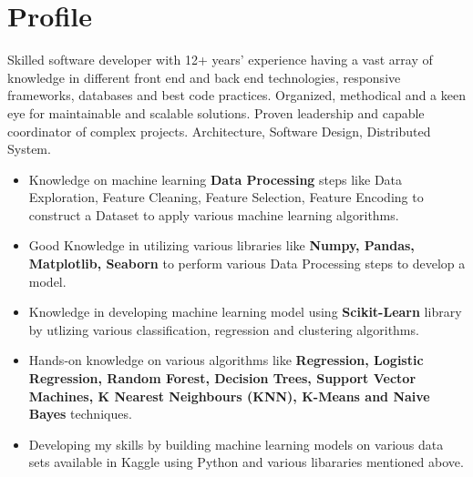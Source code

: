 \documentclass[letterpaper]{sidebarcv} %
\begin{document}
\makeprofile %


\section{Profile}

Skilled software developer with 12+ years’ experience having a vast array of knowledge in different front end and back end technologies, responsive frameworks, databases and best code practices. Organized, methodical and a keen eye for maintainable and scalable solutions. Proven leadership and capable coordinator of complex projects. Architecture, Software Design, Distributed System. \\
\begin{twenty}
\twentyitem
{}
{}
{}
{\href{}{}}
{}
{\begin{itemize}
\item Knowledge on machine learning \textbf{Data Processing} steps like Data Exploration, Feature Cleaning, Feature Selection, Feature Encoding to construct a Dataset to apply various machine learning algorithms.
\item Good Knowledge in utilizing various libraries like \textbf{Numpy, Pandas, Matplotlib, Seaborn} to perform various Data Processing steps to develop a model.
\item Knowledge in developing machine learning model using \textbf{Scikit-Learn} library by utlizing various classification, regression and clustering algorithms.
\item Hands-on knowledge on various algorithms like \textbf{Regression, Logistic Regression, Random Forest, Decision Trees, Support Vector Machines, K Nearest Neighbours (KNN), K-Means and Naive Bayes} techniques.
\item Developing my skills by building machine learning models on various data sets available in Kaggle using Python and various libararies mentioned above. 
\end{itemize}}
\\
\end{twenty}


\end{document}
